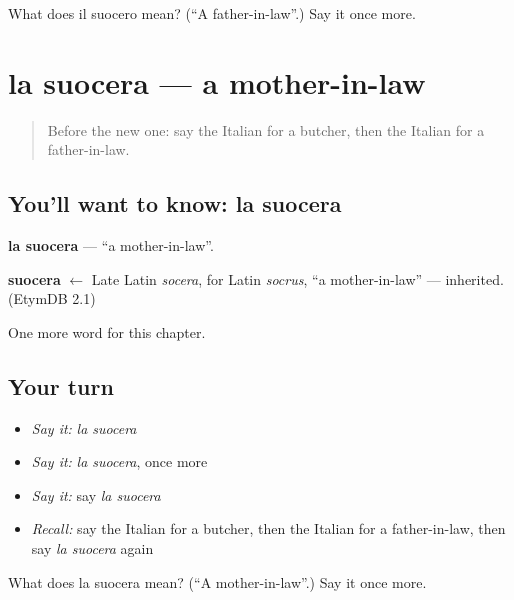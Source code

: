 \begin{tcolorbox}[breakable,colback=teal!4,colframe=teal!35!black,title={Before you move on}]
What does il suocero mean? (\textquotedblleft{}A father-in-law\textquotedblright{}.) Say it once more.
\end{tcolorbox}
\section[la suocera]{la suocera — a mother-in-law}

\label{lesson:IT-C251-suocera}



\begin{quote}
Before the new one: say the Italian for a butcher, then the Italian for a father-in-law.
\end{quote}

\subsection*{You'll want to know: la suocera}
\textbf{la suocera} — \textquotedblleft{}a mother-in-law\textquotedblright{}.

\begin{cousinweb}
\textbf{suocera} $\leftarrow$ Late Latin \emph{socera}, for Latin \emph{socrus}, \textquotedblleft{}a mother-in-law\textquotedblright{} — inherited. (EtymDB 2.1)
\end{cousinweb}

\begin{grammarlens}[title={What you've built}]
One more word for this chapter.
\end{grammarlens}

\subsection*{Your turn}
\begin{itemize}
\raggedright
  \item \emph{Say it:} \emph{la suocera}
  \item \emph{Say it:} \emph{la suocera}, once more
  \item \emph{Say it:} say \emph{la suocera}
  \item \emph{Recall:} say the Italian for a butcher, then the Italian for a father-in-law, then say \emph{la suocera} again
\end{itemize}

\begin{tcolorbox}[breakable,colback=teal!4,colframe=teal!35!black,title={Before you move on}]
What does la suocera mean? (\textquotedblleft{}A mother-in-law\textquotedblright{}.) Say it once more.
\end{tcolorbox}
